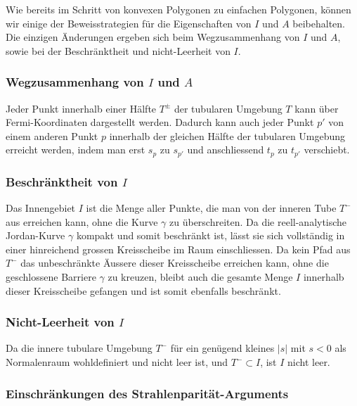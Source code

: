 Wie bereits im Schritt von konvexen Polygonen zu einfachen Polygonen, können wir einige der Beweisstrategien für die Eigenschaften von $I$ und $A$ beibehalten.
Die einzigen Änderungen ergeben sich beim Wegzusammenhang von $I$ und $A$, sowie bei der Beschränktheit und nicht-Leerheit von $I$.

\subsubsection{Wegzusammenhang von $I$ und $A$
\label{jordan:subsubsection:wegzusammenhang_innen_aussen_tubulare_umgebung}}

Jeder Punkt innerhalb einer Hälfte $T^{\pm}$ der tubularen Umgebung $T$ kann über Fermi-Koordi\-naten dargestellt werden.
Dadurch kann auch jeder Punkt $p'$ von einem anderen Punkt $p$ innerhalb der gleichen Hälfte der tubularen Umgebung erreicht werden, indem man erst $s_{p}$ zu $s_{p'}$ und anschliessend $t_{p}$ zu $t_{p'}$ verschiebt.

\subsubsection{Beschränktheit von $I$
\label{jordan:subsubsection:beschraenktheit_innen_tubulare_umgebung}}

Das Innengebiet $I$ ist die Menge aller Punkte, die man von der inneren Tube $T^{-}$ aus erreichen kann, ohne die Kurve $\gamma$ zu überschreiten. 
Da die reell-analytische Jordan-Kurve $\gamma$ kompakt und somit beschränkt ist, lässt sie sich vollständig in einer hinreichend grossen Kreisscheibe im Raum einschliessen. Da kein Pfad aus $T^{-}$ das unbeschränkte Äussere dieser Kreisscheibe erreichen kann, ohne die geschlossene Barriere $\gamma$ zu kreuzen, bleibt auch die gesamte Menge $I$ innerhalb dieser Kreisscheibe gefangen und ist somit ebenfalls beschränkt.

\subsubsection{Nicht-Leerheit von $I$
\label{jordan:subsubsection:nicht_leerheit_innen_tubulare_umgebung}}

Da die innere tubulare Umgebung $T^{-}$ für ein genügend kleines $\left|s\right|$ mit $s < 0$ als Normalenraum wohldefiniert und nicht leer ist, und $T^{-} \subset I$, ist $I$ nicht leer.

\subsubsection{Einschränkungen des Strahlenparität-Arguments
\label{jordan:subsubsection:limitationen_strahlenparitaet}}

